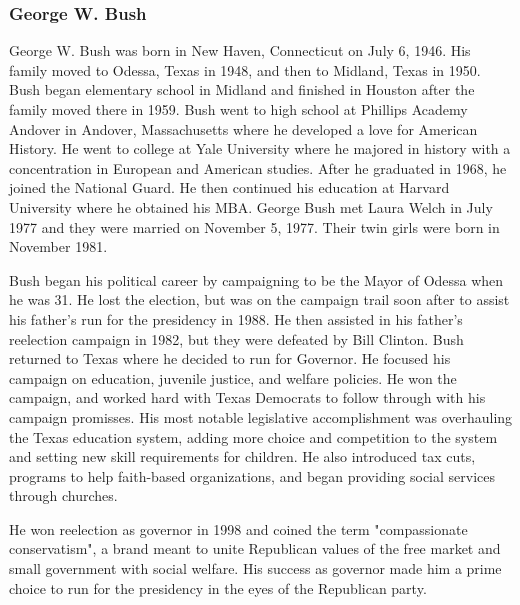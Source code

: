 \documentclass{article}
\begin{document}
        \subsubsection{George W. Bush}
        George W. Bush was born in New Haven, Connecticut on July 6, 1946. His family moved to Odessa, Texas in 1948, and then to Midland, Texas in 1950. Bush began elementary school in Midland and finished in Houston after the family moved there in 1959. Bush went to high school at Phillips Academy Andover in Andover, Massachusetts where he developed a love for American History. He went to college at Yale University where he majored in history with a concentration in European and American studies. After he graduated in 1968, he joined the National Guard. He then continued his education at Harvard University where he obtained his MBA. George Bush met Laura Welch in July 1977 and they were married on November 5, 1977. Their twin girls were born in November 1981.\cite{bushhistory}
        \par
        Bush began his political career by campaigning to be the Mayor of Odessa when he was 31. He lost the election, but was on the campaign trail soon after to assist his father's run for the presidency in 1988. He then assisted in his father's reelection campaign in 1982, but they were defeated by Bill Clinton. Bush returned to Texas where he decided to run for Governor. He focused his campaign on education, juvenile justice, and welfare policies. He won the campaign, and worked hard with Texas Democrats to follow through with his campaign promisses. His most notable legislative accomplishment was overhauling the Texas education system, adding more choice and competition to the system and setting new skill requirements for children. He also introduced tax cuts, programs to help faith-based organizations, and began providing social services through churches.\cite{bushhistory}
        \par
        He won reelection as governor in 1998 and coined the term "compassionate conservatism", a brand meant to unite Republican values of the free market and small government with social welfare. His success as governor made him a prime choice to run for the presidency in the eyes of the Republican party.\cite{bushhistory}
\end{document}
